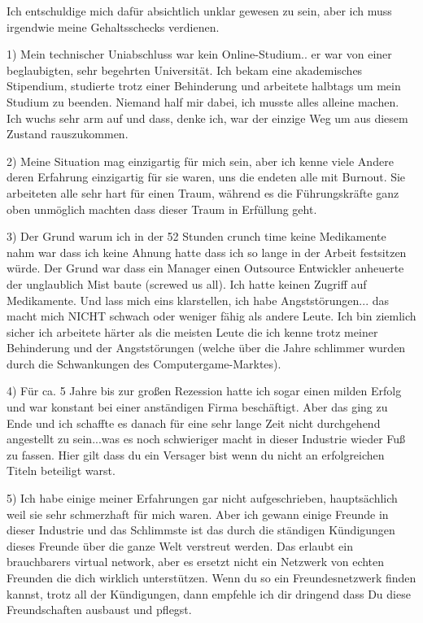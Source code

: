 Ich entschuldige mich dafür absichtlich unklar gewesen zu sein, aber ich muss irgendwie meine Gehaltsschecks verdienen. 

1) Mein technischer Uniabschluss war kein Online-Studium.. er war von einer beglaubigten, sehr begehrten Universität. Ich bekam eine akademisches Stipendium, studierte trotz einer Behinderung und arbeitete halbtags um mein Studium zu beenden. Niemand half mir dabei, ich musste alles alleine machen. Ich wuchs sehr arm auf und dass, denke ich, war der einzige Weg um aus diesem Zustand rauszukommen.

2) Meine Situation mag einzigartig für mich sein, aber ich kenne viele Andere deren Erfahrung einzigartig für sie waren, uns die endeten alle mit Burnout. Sie arbeiteten alle sehr hart für einen Traum, während es die Führungskräfte ganz oben unmöglich machten dass dieser Traum in Erfüllung geht.

3) Der Grund warum ich in der 52 Stunden crunch time keine Medikamente nahm war dass ich keine Ahnung hatte dass ich so lange in der Arbeit festsitzen würde. Der Grund war dass ein Manager einen Outsource Entwickler anheuerte der unglaublich Mist baute (screwed us all). Ich hatte keinen Zugriff auf Medikamente. Und lass mich eins klarstellen, ich habe Angststörungen... das macht mich NICHT schwach oder weniger fähig als andere Leute. Ich bin ziemlich sicher ich arbeitete härter als die meisten Leute die ich kenne trotz meiner Behinderung und der Angststörungen (welche über die Jahre schlimmer wurden durch die Schwankungen des Computergame-Marktes).

4) Für ca. 5 Jahre bis zur großen Rezession hatte ich sogar einen milden Erfolg und war konstant bei einer anständigen Firma beschäftigt. Aber das ging zu Ende und ich schaffte es danach für eine sehr lange Zeit nicht durchgehend angestellt zu sein...was es noch schwieriger macht in dieser Industrie wieder Fuß zu fassen. Hier gilt dass du ein Versager bist wenn du nicht an erfolgreichen Titeln beteiligt warst.

5) Ich habe einige meiner Erfahrungen gar nicht aufgeschrieben, hauptsächlich weil sie sehr schmerzhaft für mich waren. Aber ich gewann einige Freunde in dieser Industrie und das Schlimmste ist das durch die ständigen Kündigungen dieses Freunde über die ganze Welt verstreut werden. Das erlaubt ein brauchbarers virtual network, aber es ersetzt nicht ein Netzwerk von echten Freunden die dich wirklich unterstützen. Wenn du so ein Freundesnetzwerk finden kannst, trotz all der Kündigungen, dann empfehle ich dir dringend dass Du diese Freundschaften ausbaust und pflegst. 

